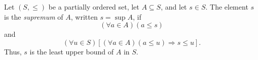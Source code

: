 \begin{definition}[Supremum]
\label{def:supremum}
Let $(S,\leq)$ be a partially ordered set, let $A\subseteq S$, and let
$s\in S$. The element $s$ is the \emph{supremum} of $A$, written
$s=\sup A$, if
\[
  (\forall a\in A)(a\leq s)
\]
and
\[
  (\forall u\in S)
  \left[
    (\forall a\in A)(a\leq u)
    \Longrightarrow
    s\leq u
  \right].
\]
Thus, $s$ is the least upper bound of $A$ in $S$.
\end{definition}